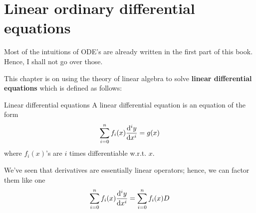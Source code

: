 \chapter{Linear ordinary differential equations}

Most of the intuitions of ODE's are already written in the first part of this book. Hence, I shall not go over those.

This chapter is on using the theory of linear algebra to solve \textbf{linear differential equations} which is defined as follows:

\begin{df}{Linear differential equations}{}
  A linear differential equation is an equation of the form
  \begin{equation}
    \sum_{i = 0}^{n} f_i(x)\odv[order = i]{y}{x} = g(x)
  \end{equation}
  where \(f_i(x)\)'s are \(i\) times differentiable w.r.t. \(x\).
\end{df}

We've seen that derivatives are essentially linear operators; hence, we can factor them like one
\begin{equation}
  \sum_{i = 0}^{n} f_i(x)\odv[order = i]{y}{x} = \sum_{i = 0}^{n} f_i(x) D
\end{equation}
